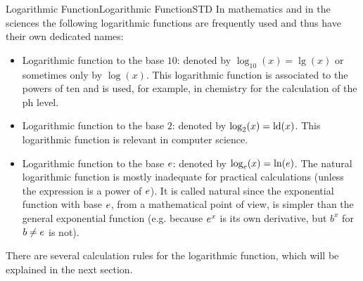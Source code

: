 \begin{MXContent}{Logarithmic Function}{Logarithmic Function}{STD}
In mathematics and in the sciences the following logarithmic functions are frequently used and 
thus have their own dedicated names:
\begin{itemize}
\item{Logarithmic function to the base $10$: denoted by $\log_{10}(x)=\lg(x)$ or sometimes only by $\log(x)$. This 
logarithmic function is associated to the powers of ten and is used, for example, in chemistry for the calculation of 
the ph level.}
\item{Logarithmic function to the base $2$: denoted by $\log_2(x)=\operatorname{ld}(x)$. This 
logarithmic function is relevant in computer science.}
\item{Logarithmic function to the base $e$: denoted by $\log_e(x)=\ln(e)$. The natural logarithmic function
is mostly inadequate for practical calculations (unless the expression is a power of $e$). It is called 
natural since the exponential function with base $e$, from a mathematical point of view, is simpler than 
the general exponential function (e.g. because $e^x$ is its own derivative, but $b^x$ for $b\not=e$ is not).}
\end{itemize}

There are several calculation rules for the logarithmic function, which will be explained in the next section.
\end{MXContent}

